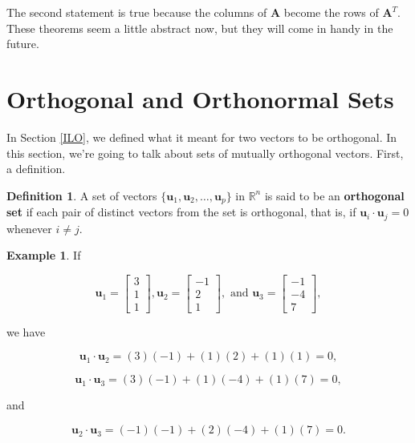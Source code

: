 \documentclass[
]{book}
\theoremstyle{definition}
\newtheorem{definition}{Definition}[chapter]
\theoremstyle{definition}
\newtheorem{example}{Example}[chapter]
\theoremstyle{definition}
\theoremstyle{definition}
\theoremstyle{remark}
\begin{document}
The second statement is true because the columns of \(\mathbf{A}\) become the rows of \(\mathbf{A}^T\). These theorems seem a little abstract now, but they will come in handy in the future.

\section{Orthogonal and Orthonormal Sets}\label{orthogonal-and-orthonormal-sets}

In Section \ref{ILO}, we defined what it meant for two vectors to be orthogonal. In this section, we're going to talk about sets of mutually orthogonal vectors. First, a definition.

\begin{defbox}

\begin{definition}
A set of vectors \(\{\mathbf{u}_1,\mathbf{u}_2,\dots,\mathbf{u}_p\}\) in \(\mathbb{R}^n\) is said to be an \textbf{orthogonal set} if each pair of distinct vectors from the set is orthogonal, that is, if \(\mathbf{u}_i\cdot\mathbf{u}_j=0\) whenever \(i\neq j\).
\end{definition}

\end{defbox}

\begin{examplebox}

\begin{example}
\protect\hypertarget{exm:orthoset}{}\label{exm:orthoset}If

\[\mathbf{u}_1=\begin{bmatrix}3\\1\\1\end{bmatrix},\mathbf{u}_2=\begin{bmatrix}-1\\2\\1\end{bmatrix},\text{ and }\mathbf{u}_3=\begin{bmatrix}-1\\-4\\7\end{bmatrix},\]

we have

\[\mathbf{u}_1\cdot \mathbf{u}_2=(3)(-1)+(1)(2)+(1)(1)=0,\]

\[\mathbf{u}_1\cdot\mathbf{u}_3=(3)(-1)+(1)(-4)+(1)(7)=0,\]

and

\[\mathbf{u}_2\cdot \mathbf{u}_3=(-1)(-1)+(2)(-4)+(1)(7)=0.\]
\end{example}

\end{examplebox}
\end{document}

